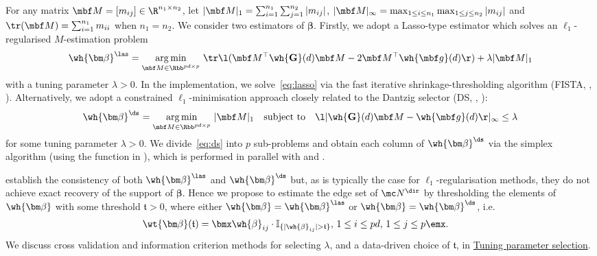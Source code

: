 For any matrix $\mbf M = [m_{ij}] \in \R^{n_1 \times n_2}$, let $\vert \mbf M \vert_1 = \sum_{i = 1}^{n_1} \sum_{j = 1}^{n_2} \vert m_{ij} \vert$, $\vert \mbf M \vert_\infty = \max_{1 \le i \le n_1} \max_{1 \le j \le n_2} \vert m_{ij} \vert$ and $\tr(\mbf M) = \sum_{i = 1}^{n_1} m_{ii}$ when $n_1 = n_2$.
We consider two estimators of $\bm\beta$.
Firstly, we adopt a Lasso-type estimator which solves an $\ell_1$-regularised $M$-estimation problem
\begin{align}
\label{eq:lasso}
\wh{\bm\beta}^{\las} = \underset{\mbf M \in \Rbb^{pd \times p}}{\arg\min} \
\tr\l( \mbf M^\top \wh{\mathbf G}(d) \mbf M - 2\mbf M^\top\wh{\mbf g}(d) \r)
+ \lambda \vert \mbf M \vert_1
\end{align}
with a tuning parameter $\lambda > 0$.
In the implementation, we solve~\eqref{eq:lasso} via the fast iterative shrinkage-thresholding algorithm (FISTA, \citeauthor{beck2009fast}, \citeyear{beck2009fast}).
Alternatively, we adopt a constrained $\ell_1$-minimisation approach closely related to the Dantzig selector (DS, \citeauthor{candes2007dantzig}, \citeyear{candes2007dantzig}):
\begin{align}
\label{eq:ds}
\wh{\bm\beta}^{\ds} =  \underset{\mbf M \in \Rbb^{pd \times p}}{\arg\min} \ \vert \mbf M \vert_1
\quad \text{subject to} \quad
\l\vert \wh{\mathbf G}(d) \mbf M - \wh{\mbf g}(d) \r\vert_\infty \le \lambda
\end{align}
for some tuning parameter $\lambda > 0$.
We divide~\eqref{eq:ds} into $p$ sub-problems and obtain each column of $\wh{\bm\beta}^{\ds}$ via the simplex algorithm (using the function  in  \citep{lpsolve}), which is performed in parallel  with  and  \citep{doparallel, foreach}.

\cite{barigozzi2022fnets} establish the consistency of both $\wh{\bm\beta}^{\las}$ and $\wh{\bm\beta}^{\ds}$ but, as is typically the case for $\ell_1$-regularisation methods, they do not achieve exact recovery of the support of $\bm\beta$.
Hence we propose to estimate the edge set of $\mc N^{\dir}$ by thresholding the elements of $\wh{\bm\beta}$ with some threshold $\mathfrak{t} > 0$, where either $\wh{\bm\beta} = \wh{\bm\beta}^{\las}$ or $\wh{\bm\beta} = \wh{\bm\beta}^{\ds}$, i.e.\
\begin{align}
\label{eq:threshold}
\wt{\bm\beta}(\mathfrak{t}) &= 
\bmx \wh{\beta}_{ij} \cdot \mathbb{I}_{\{\vert \wh{\beta}_{ij} \vert > \mathfrak{t} \}},
\, 1 \le i \le pd, \, 1 \le j \le p \emx.
\end{align}
We discuss cross validation and information criterion methods for selecting $\lambda$, and a data-driven choice of $\mathfrak{t}$, in \hyperref[sec:tuning]{Tuning parameter selection}. 

